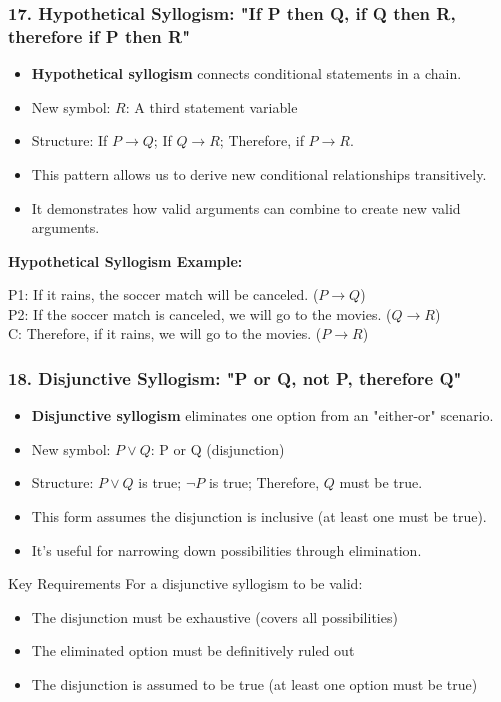 \documentclass{beamer}
\newcommand{\newlogicalsymbol}[2]{
\textbf{#1}: #2
}
\begin{document}
\begin{frame}
\frametitle{17. Hypothetical Syllogism: "If P then Q, if Q then R, therefore if P then R"}
\begin{itemize}
\item \textbf{Hypothetical syllogism} connects conditional statements in a chain.
\item New symbol: \newlogicalsymbol{$R$}{A third statement variable}
\item Structure: If $P \rightarrow Q$; If $Q \rightarrow R$; Therefore, if $P \rightarrow R$.
\item This pattern allows us to derive new conditional relationships transitively.
\item It demonstrates how valid arguments can combine to create new valid arguments.
\end{itemize}

\begin{example}
\textbf{Hypothetical Syllogism Example:}

P1: If it rains, the soccer match will be canceled. ($P \rightarrow Q$) \\
P2: If the soccer match is canceled, we will go to the movies. ($Q \rightarrow R$) \\
C: Therefore, if it rains, we will go to the movies. ($P \rightarrow R$) \\

\end{example}
\end{frame}

\begin{frame}
\frametitle{18. Disjunctive Syllogism: "P or Q, not P, therefore Q"}
\begin{itemize}
\item \textbf{Disjunctive syllogism} eliminates one option from an "either-or" scenario.
\item New symbol: \newlogicalsymbol{$P \lor Q$}{P or Q (disjunction)}
\item Structure: $P \lor Q$ is true; $\neg P$ is true; Therefore, $Q$ must be true.
\item This form assumes the disjunction is inclusive (at least one must be true).
\item It's useful for narrowing down possibilities through elimination.
\end{itemize}

\begin{block}{Key Requirements}
For a disjunctive syllogism to be valid:
\begin{itemize}
\item The disjunction must be exhaustive (covers all possibilities)
\item The eliminated option must be definitively ruled out
\item The disjunction is assumed to be true (at least one option must be true)
\end{itemize}

\end{block}
\end{frame}
\end{document}

